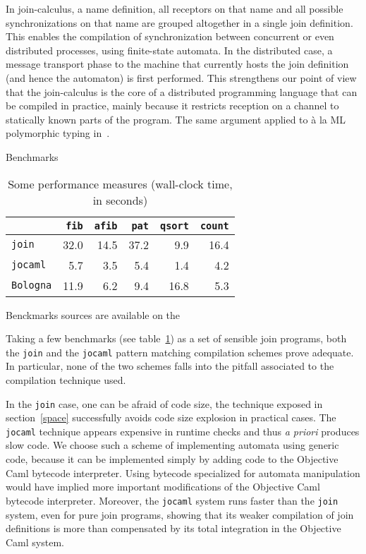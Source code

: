 In join-calculus, a name definition, all receptors on that name and all
possible synchronizations on that name are grouped altogether in a single
join definition. This enables the compilation of synchronization
between concurrent or even distributed processes, using finite-state
automata.
In the distributed case, a message transport phase to the
machine that currently hosts the join definition (and hence the
automaton) is first performed.  This strengthens our point of view
that the join-calculus is the core of a distributed programming
language that can be compiled in practice, mainly because it restricts
reception on a channel to statically known parts of the program.  The
same argument applied to \`a la ML polymorphic typing
in~\cite{join-typing-97}.

\begin{cutflow}{Benchmarks}
\begin{table}[ht]
\begin{center}
\begin{tabular}{l@{\quad}r@{\quad}r@{\quad}r@{\quad}r@{\quad}r}
& \texttt{fib} &
\texttt{afib} &
\texttt{pat} &
\texttt{qsort} &
\texttt{count}\\ \hline
\texttt{join} &  32.0 & 14.5 & 37.2 & 9.9 & 16.4 \\
\texttt{jocaml} & 5.7 &  3.5 & 5.4 & 1.4 & 4.2 \\
\texttt{Bologna} & 11.9 & 6.2 &  9.4 & 16.8 & 5.3 \\
\end{tabular}
\end{center}
\caption{\label{perf}Some performance measures (wall-clock time, in seconds)}
\end{table}
Benckmarks sources are available on the 
\end{cutflow}
Taking a few benchmarks (see table~\ref{perf})
as a set of sensible join programs, both the
{\tt join} and the {\tt jocaml} pattern matching compilation schemes
prove adequate.  In particular, none of the two schemes falls into the
pitfall associated to the compilation technique used.

In the {\tt join} case, one can be afraid of code size, the technique
exposed in section~\ref{space} successfully avoids code size explosion
in practical cases.  The {\tt jocaml} technique appears expensive in
runtime checks and thus {\em a priori} produces slow code.  We choose
such a scheme of implementing automata using generic code, because it
can be implemented simply by adding code to the Objective Caml
bytecode interpreter.  Using bytecode specialized for automata
manipulation would have implied more important modifications of the
Objective Caml bytecode interpreter. Moreover, the {\tt jocaml} system
runs faster than the {\tt join} system, even for pure join programs,
showing that its weaker compilation of join definitions is more than
compensated by its total integration in the Objective Caml system.

